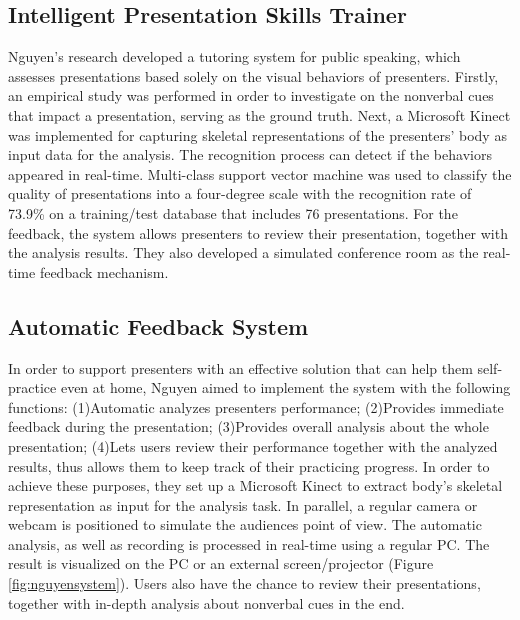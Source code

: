 \subsection{Intelligent Presentation Skills Trainer}
\par Nguyen's research developed a tutoring system for public speaking, which assesses presentations based solely on the visual behaviors of presenters. Firstly, an empirical study was performed in order to investigate on the nonverbal cues that impact a presentation, serving as the ground truth. Next, a Microsoft Kinect was implemented for capturing skeletal representations of the presenters' body as input data for the analysis. The recognition process can detect if the behaviors appeared in real-time. Multi-class support vector machine was used to classify the quality of presentations into a four-degree scale with the recognition rate of 73.9\% on a training/test database that includes 76 presentations. For the feedback, the system allows presenters to review their presentation, together with the analysis results. They also developed a simulated conference room as the real-time feedback mechanism.
\subsection*{Automatic Feedback System}
\par In order to support presenters with an effective solution that can help them self-practice even at home, Nguyen aimed to implement the system with the following functions: (1)Automatic analyzes presenters performance; (2)Provides immediate feedback during the presentation; (3)Provides overall analysis about the whole presentation; (4)Lets users review their performance together with the analyzed results, thus allows them to keep track of their practicing progress. In order to achieve these purposes, they set up a Microsoft Kinect to extract body's skeletal representation as input for the analysis task. In parallel, a regular camera or webcam is positioned to simulate the audiences point of view. The automatic analysis, as well as recording is processed in real-time using a regular PC. The result is visualized on the PC or an external screen/projector (Figure \ref{fig:nguyensystem}). Users also have the chance to review their presentations, together with in-depth analysis about nonverbal cues in the end.


